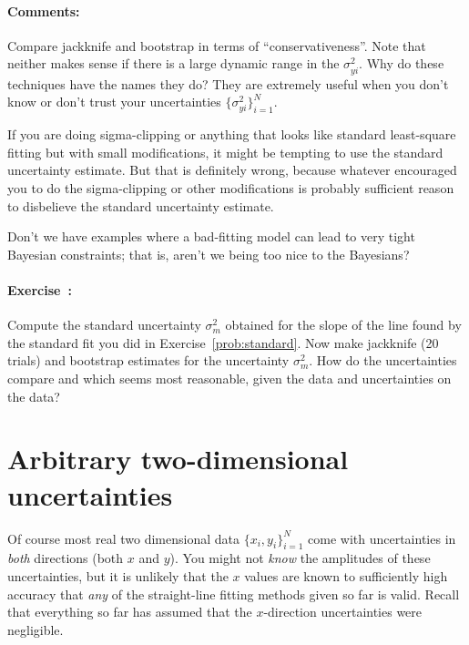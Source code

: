 \documentclass[12pt]{article}
\newcommand{\problemname}{Exercise}
\newcommand{\commentsname}{Comments}
\newcounter{problem}
\newenvironment{problem}{\paragraph{\problemname~\theproblem:}\refstepcounter{problem}}{}
\newenvironment{comments}{\paragraph{\commentsname:}}{}
\newcommand{\setofall}[3]{\{{#1}\}_{{#2}}^{{#3}}}
\newcommand{\allxy}{\setofall{x_i,y_i}{i=1}{N}}
\newcommand{\allsigmay}{\setofall{\sigma_{yi}^2}{i=1}{N}}
\begin{document}
\begin{comments}
Compare jackknife and bootstrap in terms of ``conservativeness''.
Note that neither makes sense if there is a large dynamic range in the
$\sigma_{yi}^2$.  Why do these techniques have the names they do?
They are extremely useful when you don't know or don't trust your
uncertainties $\allsigmay$.

If you are doing sigma-clipping or anything that looks like standard
least-square fitting but with small modifications, it might be
tempting to use the standard uncertainty estimate.  But that is
definitely wrong, because whatever encouraged you to do the
sigma-clipping or other modifications is probably sufficient reason to
disbelieve the standard uncertainty estimate.

Don't we have examples where a bad-fitting model can lead to very
tight Bayesian constraints; that is, aren't we being too nice to the
Bayesians?
\end{comments}

\begin{problem}
Compute the standard uncertainty $\sigma_m^2$ obtained for the slope
of the line found by the standard fit you did in
\problemname~\ref{prob:standard}.  Now make jackknife (20 trials) and
bootstrap estimates for the uncertainty $\sigma_m^2$.  How do the
uncertainties compare and which seems most reasonable, given the data
and uncertainties on the data?
\end{problem}

\section{Arbitrary two-dimensional uncertainties}\label{sec:twod}

Of course most real two dimensional data $\allxy$ come with
uncertainties in \emph{both} directions (both $x$ and $y$).  You might
not \emph{know} the amplitudes of these uncertainties, but it is
unlikely that the $x$ values are known to sufficiently high accuracy
that \emph{any} of the straight-line fitting methods given so far is
valid.  Recall that everything so far has assumed that the
$x$-direction uncertainties were negligible.
\end{document}
